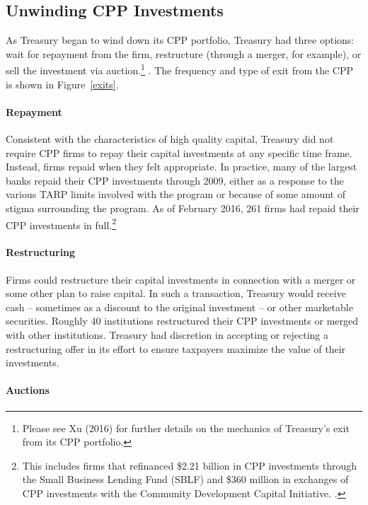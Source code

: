 \documentclass[12pt]{article}
\begin{document}
\subsection*{Unwinding CPP Investments}

As Treasury began to wind down its CPP portfolio, Treasury had three options: wait for repayment from the firm, restructure (through a merger, for example), or sell the investment via auction.\footnote{Please see Xu (2016) for further details on the mechanics of Treasury's exit from its CPP portfolio.} \citep{MassadExit}. The frequency and type of exit from the CPP is shown in Figure~\ref{exits}. 

\paragraph{Repayment}

Consistent with the characteristics of high quality capital, Treasury did not require CPP firms to repay their capital investments at any specific time frame. Instead, firms repaid when they felt appropriate. In practice, many of the largest banks repaid their CPP investments through 2009, either as a response to the various TARP limits involved with the program or because of some amount of stigma surrounding the program. As of February 2016, 261 firms had repaid their CPP investments in full.\footnote{This includes firms that refinanced \$2.21 billion in CPP investments through the Small Business Lending Fund (SBLF) and \$360 million in exchanges of CPP investments with the Community Development Capital Initiative. \citep{ProgramStatus}.}

\paragraph{Restructuring}

Firms could restructure their capital investments in connection with a merger or some other plan to raise capital. In such a transaction, Treasury would receive cash -- sometimes as a discount to the original investment -- or other marketable securities. Roughly 40 institutions restructured their CPP investments or merged with other institutions. Treasury had discretion in accepting or rejecting a restructuring offer in its effort to ensure taxpayers maximize the value of their investments.

\paragraph{Auctions}
\end{document}
